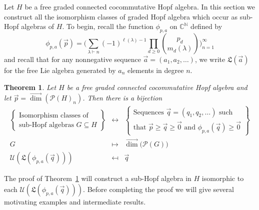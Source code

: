 \documentclass[11pt]{amsart}
\newtheorem{thm}{Theorem}
\theoremstyle{definition}
\numberwithin{equation}{section}
\def\NN{{\mathbb N}}
\def\CC{{\mathbb C}}
\newcommand{\vecdim}{\overrightarrow{\dim}}
\begin{document}
Let $H$ be a free graded connected cocommutative Hopf algebra.  
In this section we construct all the isomorphism classes of graded Hopf algebra which occur as sub-Hopf algebras of $H$.  
To begin, recall the function $\phi_{p, a}$ on $\CC^{\NN}$ defined by
\[
\phi_{p, a}(\vec{p}) = \big( \sum_{\lambda \vdash n} (-1)^{\ell(\lambda) - 1} \prod_{d \ge 0} \binom{p_{d}}{m_{d}(\lambda)} \big)_{n = 1}^{\infty}
\]
and recall that for any nonnegative sequence $\vec{a} = (a_{1}, a_{2}, \ldots)$, we write $\mathfrak{L}(\vec{a})$ for the free Lie algebra generated by $a_{n}$ elements in degree $n$.

\begin{thm}
\label{thm:subclassification2}
Let $H$ be a free graded connected cocommutative Hopf algebra and let $\vec{p} = \vecdim(\mathcal{P}(H)_{n})$.  Then there is a bijection
\[
\begin{array}{rcl}
\left\{\begin{array}{c}
\text{Isomorphism classes of} \\
\text{sub-Hopf algebras $G \subseteq H$}
\end{array}\right\}
& \leftrightarrow & 
\left\{\begin{array}{c}
\text{Sequences $\vec{q} = (q_{1}, q_{2}, \ldots)$ such } \\
\text{that $\vec{p} \ge \vec{q} \ge \vec{0}$ and $\phi_{p, a}(\vec{q}) \ge \vec{0}$} 
\end{array}\right\} \\[2em]
G & \mapsto & \vecdim\big(\mathcal{P}(G)\big) \\
\mathcal{U}(\mathfrak{L}(\phi_{p, a}(\vec{q}))) & \mapsfrom & \vec{q}
\end{array}
\]
\end{thm}

The proof of Theorem~\ref{thm:subclassification2} will construct a sub-Hopf algebra in $H$ isomorphic to each $\mathcal{U}(\mathfrak{L}(\phi_{p, a}(\vec{q})))$.  
Before completing the proof we will give several motivating examples and intermediate results.
\end{document}
